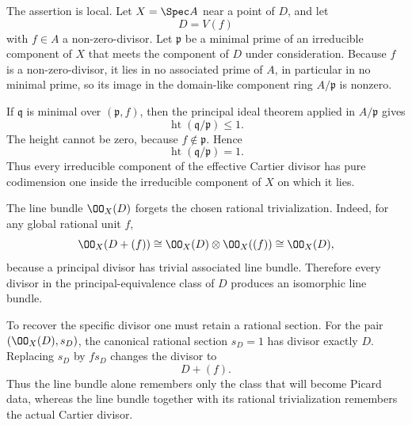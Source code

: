 \begin{solution}
The assertion is local.  Let \(X=\Spec A\) near a point of \(D\), and let
\[
D=V(f)
\]
with \(f\in A\) a non-zero-divisor.  Let \(\mathfrak p\) be a minimal prime of an irreducible component of \(X\) that meets the component of \(D\) under consideration.  Because \(f\) is a non-zero-divisor, it lies in no associated prime of \(A\), in particular in no minimal prime, so its image in the domain-like component ring \(A/\mathfrak p\) is nonzero.

If \(\mathfrak q\) is minimal over \((\mathfrak p,f)\), then the principal ideal theorem applied in \(A/\mathfrak p\) gives
\[
\operatorname{ht}(\mathfrak q/\mathfrak p)\le1.
\]
The height cannot be zero, because \(f\notin\mathfrak p\).  Hence
\[
\operatorname{ht}(\mathfrak q/\mathfrak p)=1.
\]
Thus every irreducible component of the effective Cartier divisor has pure codimension one inside the irreducible component of \(X\) on which it lies.
\end{solution}

\begin{solution}
The line bundle \(\OO_X(D)\) forgets the chosen rational trivialization.  Indeed, for any global rational unit \(f\),
\[
\OO_X(D+(f))
\cong\OO_X(D)\otimes\OO_X((f))
\cong\OO_X(D),
\]
because a principal divisor has trivial associated line bundle.  Therefore every divisor in the principal-equivalence class of \(D\) produces an isomorphic line bundle.

To recover the specific divisor one must retain a rational section.  For the pair \((\OO_X(D),s_D)\), the canonical rational section \(s_D=1\) has divisor exactly \(D\).  Replacing \(s_D\) by \(f s_D\) changes the divisor to
\[
D+(f).
\]
Thus the line bundle alone remembers only the class that will become Picard data, whereas the line bundle together with its rational trivialization remembers the actual Cartier divisor.
\end{solution}
